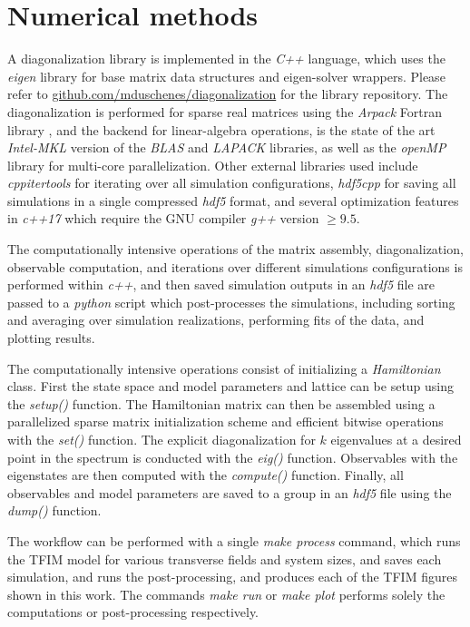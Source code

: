 \documentclass[12pt]{article}{}
\begin{document}
\newpage
\section*{Numerical methods} \label{sec:numericalmethods}

A diagonalization library is implemented in the \emph{C++} language, which uses the \emph{eigen} \cite{eigen} library for base matrix data structures and eigen-solver wrappers. Please refer to \href{https://github.com/mduschenes/diagonalization}{github.com/mduschenes/diagonalization} for the library repository. The diagonalization is performed for sparse real matrices using the \emph{Arpack} Fortran library \cite{Lehoucq1998}, and the backend for linear-algebra operations, is the state of the art \emph{Intel-MKL} version of the \emph{BLAS} and \emph{LAPACK} libraries, as well as the \emph{openMP} library for multi-core parallelization. Other external libraries used include \emph{cppitertools} for iterating over all simulation configurations, \emph{hdf5cpp} for saving all simulations in a single compressed \emph{hdf5} format, and several optimization features in \emph{c++17} which require the GNU compiler \emph{g++} version $\geq 9.5$.

The computationally intensive operations of the matrix assembly, diagonalization, observable computation, and iterations over different simulations configurations is performed within \emph{c++}, and then saved simulation outputs in an \emph{hdf5} file are passed to a \emph{python} script which post-processes the simulations, including sorting and averaging over simulation realizations, performing fits of the data, and plotting results. 

The computationally intensive operations consist of initializing a \emph{Hamiltonian} class. First the state space and model parameters and lattice can be setup using the \emph{setup()} function. The Hamiltonian matrix can then be assembled using a parallelized sparse matrix initialization scheme and efficient bitwise operations \cite{Sandvik2010,Jung2020} with the \emph{set()} function. The explicit diagonalization for $k$ eigenvalues at a desired point in the spectrum is conducted with the \emph{eig()} function. Observables with the eigenstates are then computed with the \emph{compute()} function. Finally, all observables and model parameters are saved to a group in an \emph{hdf5} file using the \emph{dump()} function.

The workflow can be performed with a single \emph{make process} command, which runs the TFIM model for various transverse fields and system sizes, and saves each simulation, and runs the post-processing, and produces each of the TFIM figures shown in this work. The commands \emph{make run} or \emph{make plot} performs solely the computations or post-processing respectively. 
\end{document}
